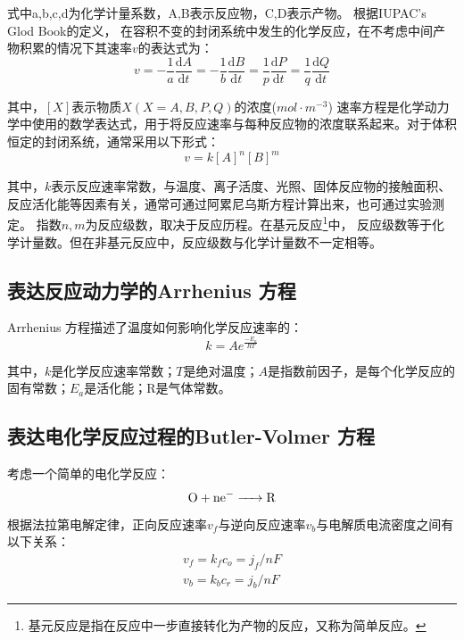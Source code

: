 式中a,b,c,d为化学计量系数，A,B表示反应物，C,D表示产物。
根据IUPAC's Glod Book的定义\cite{GlossaryoftermsusedinphysicalorganicchemistryIUPACRecommendations1994}，
在容积不变的封闭系统中发生的化学反应，在不考虑中间产物积累的情况下其速率$v$的表达式为：
\begin{equation}
    v=-\frac{1}{a}\frac{\mathrm{d}A}{\mathrm{d}t}
    =-\frac{1}{b}\frac{\mathrm{d}B}{\mathrm{d}t}
    =\frac{1}{p}\frac{\mathrm{d}P}{\mathrm{d}t}
    =\frac{1}{q}\frac{\mathrm{d}Q}{\mathrm{d}t}
\end{equation}

其中，$[X]$表示物质$X (X=A,B,P,Q)$的浓度($mol\cdot{m^{-3}}$)
速率方程是化学动力学中使用的数学表达式，用于将反应速率与每种反应物的浓度联系起来。对于体积恒定的封闭系统，通常采用以下形式：
\begin{equation}
    v=k[A]^n[B]^m
    \label{rate_equation}
\end{equation}

其中，$k$表示反应速率常数，与温度、离子活度、光照、固体反应物的接触面积、反应活化能等因素有关，通常可通过阿累尼乌斯方程计算出来，也可通过实验测定。
指数$n,m$为反应级数，取决于反应历程。在基元反应\footnote{基元反应是指在反应中一步直接转化为产物的反应，又称为简单反应。}中，
反应级数等于化学计量数。但在非基元反应中，反应级数与化学计量数不一定相等\cite{Witelski2015}。
\subsection{表达反应动力学的Arrhenius 方程}
Arrhenius 方程描述了温度如何影响化学反应速率的：
\begin{equation}
    k=Ae^{\frac{-E_a}{RT}}
    \label{equation:Arrhenius}
\end{equation}

其中，$k$是化学反应速率常数；$T$是绝对温度；$A$是指数前因子，是每个化学反应的固有常数；$E_a$是活化能；R是气体常数\cite{ref1}。


\subsection{表达电化学反应过程的Butler-Volmer 方程}
考虑一个简单的电化学反应：
\begin{equation}
    \ce{O + ne- -> R}
\end{equation}

根据法拉第电解定律，正向反应速率$v_f$与逆向反应速率$v_b$与电解质电流密度之间有以下关系：
\begin{equation}
    \begin{aligned}
        v_f=k_fc_o=j_f/nF\\
        v_b=k_bc_r=j_b/nF          %
    \end{aligned}
\end{equation}


